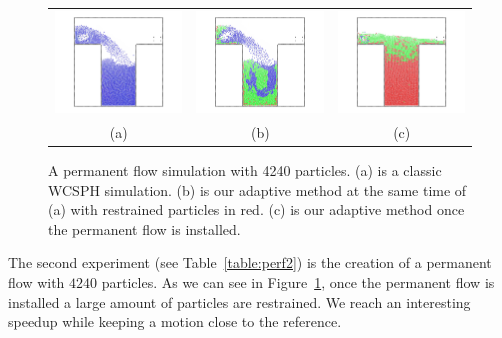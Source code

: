 \begin{figure}[!ht]
    \centering
    \begin{tabular}{ccc}
        \includegraphics[width=.32\linewidth]{images/arps-vriphys2013/PermanentFlowSPH.jpg} &
        \includegraphics[width=.32\linewidth]{images/arps-vriphys2013/PermanentFlowARPSColor.jpg} &
  \includegraphics[width=.32\linewidth]{images/arps-vriphys2013/PermanentFlowARPSColor2.jpg} \\
  (a) & (b) & (c)
    \end{tabular}
    \caption[ARPS: Permanent flow simulations]{\label{fig:permanentflow} A permanent flow simulation with 4240 particles.
    (a) is a classic WCSPH simulation. (b) is our adaptive method at the same time of (a) with restrained particles in red. (c) is our adaptive method once the permanent flow is installed.}
\end{figure}
\newline
The second experiment (see Table~\ref{table:perf2}) is the creation of a permanent flow with $4240$ particles. As we can see in Figure~\ref{fig:permanentflow}, once the permanent flow is installed a large amount of particles are restrained. We reach an interesting speedup while keeping a motion close to the reference.
